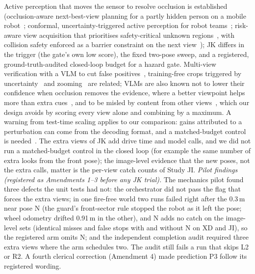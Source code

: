 Active perception that moves the sensor to resolve occlusion is established (occlusion-aware next-best-view planning for a partly hidden person on a mobile robot~\cite{hu2026oanbv}; conformal, uncertainty-triggered active perception for robot teams~\cite{podolinsky2026coglance}; risk-aware view acquisition that prioritises safety-critical unknown regions~\cite{liu2024raem,mollaei2025activenbv}, with collision safety enforced as a barrier constraint on the next view~\cite{mollaei2026splatcbf}); JK differs in the trigger (the gate's own low score), the fixed two-pose sweep, and a registered, ground-truth-audited closed-loop budget for a hazard gate. Multi-view verification with a VLM to cut false positives~\cite{liang2026zonda}, training-free crops triggered by uncertainty~\cite{wang2026vicropdet} and zooming~\cite{shen2024zoomeye} are related; VLMs are also known not to lower their confidence when occlusion removes the evidence, where a better viewpoint helps more than extra cues~\cite{zhang2026seeingisnt}, and to be misled by content from other views~\cite{park2026multiviewhallu}, which our design avoids by scoring every view alone and combining by a maximum. A warning from test-time scaling applies to our comparison: gains attributed to a perturbation can come from the decoding format, and a matched-budget control is needed~\cite{zheng2026decodingformat}. The extra views of JK add drive time and model calls, and we did not run a matched-budget control in the closed loop (for example the same number of extra looks from the front pose); the image-level evidence that the new poses, not the extra calls, matter is the per-view catch counts of Study JI.
\emph{Pilot findings (registered as Amendments 1--3 before any JK trial).} The mechanics pilot found three defects the unit tests had not: the orchestrator did not pass the flag that forces the extra views; in one fire-free world two runs failed right after the 0.3\,m near pose N (the guard's front-sector rule stopped the robot as it left the pose; wheel odometry drifted 0.91\,m in the other), and N adds no catch on the image-level sets (identical misses and false stops with and without N on XD and JI), so the registered arm omits N; and the independent completion audit required three extra views where the arm schedules two. The audit still fails a run that skips L2 or R2. A fourth clerical correction (Amendment 4) made prediction P3 follow its registered wording.
